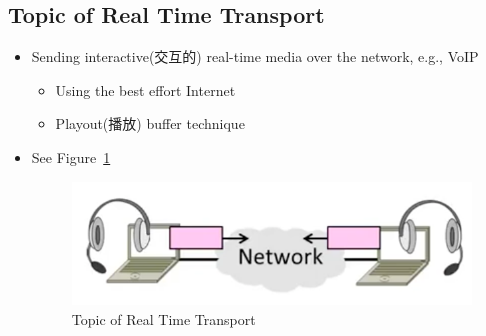 \documentclass[12pt]{ctexart}   %
\begin{document}
	\subsection{Topic of Real Time Transport}
	\begin{itemize}
		\item Sending interactive(交互的) real-time media over the network, e.g., VoIP
		\begin{itemize}
			\item Using the best effort Internet
			\item Playout(播放) buffer technique
		\end{itemize}
		\item See Figure~\ref{fig:9-2-1}
		  
		 \begin{figure}[h!] %
		\centering
		 \includegraphics[scale=0.7]{images/9-2-1}
		\caption{ Topic of Real Time Transport }
		 \label{fig:9-2-1}
		 \end{figure}
	\end{itemize}
	
\end{document}
